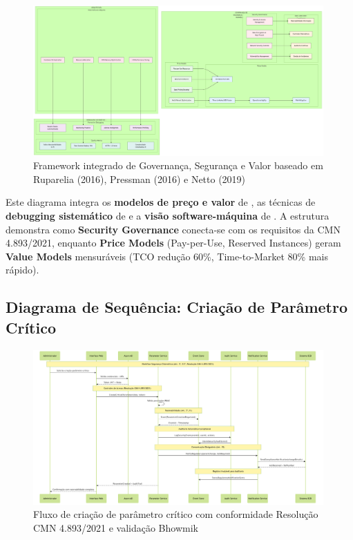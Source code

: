 \begin{figure}[h]
    \centering
    \includegraphics[width=0.99\textwidth]{figuras/v_008_02_governanca_seguranca_valor.png} 
    \caption{Framework integrado de Governança, Segurança e Valor baseado em Ruparelia (2016), Pressman (2016) e Netto (2019)}
    \label{fig:v_008_02_governanca_seguranca_valor}
\end{figure}

	Este diagrama integra os \textbf{modelos de preço e valor} de , as técnicas de \textbf{debugging sistemático} de  e a \textbf{visão software-máquina} de \cite{Netto2006}. A estrutura demonstra como \textbf{Security Governance} conecta-se com os requisitos da CMN 4.893/2021, enquanto \textbf{Price Models} (Pay-per-Use, Reserved Instances) geram \textbf{Value Models} mensuráveis (TCO redução 60\%, Time-to-Market 80\% mais rápido).

\subsection{Diagrama de Sequência: Criação de Parâmetro Crítico}

\begin{figure}[h]
    \centering
    \includegraphics[width=0.99\textwidth]{figuras/v_006_01_criacao_parametro_critico.png} 
    \caption{Fluxo de criação de parâmetro crítico com conformidade Resolução CMN 4.893/2021 e validação Bhowmik}
    \label{fig:v_006_01_criacao_parametro_critico}
\end{figure}

